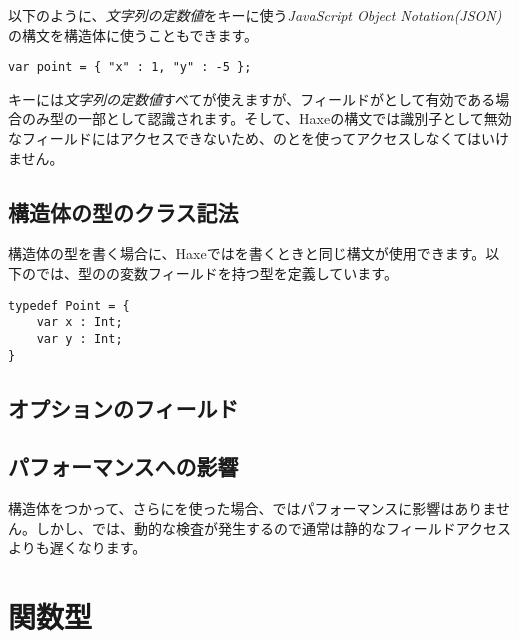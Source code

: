 以下のように、\emph{文字列の定数値}をキーに使う\emph{JavaScript Object Notation(JSON)}の構文を構造体に使うこともできます。

\begin{lstlisting}
var point = { "x" : 1, "y" : -5 };
\end{lstlisting}

キーには\emph{文字列の定数値}すべてが使えますが、フィールドがとして有効である場合のみ型の一部として認識されます。そして、Haxeの構文では識別子として無効なフィールドにはアクセスできないため、のとを使ってアクセスしなくてはいけません。

\subsection{構造体の型のクラス記法}
\label{types-structure-class-notation}

構造体の型を書く場合に、Haxeではを書くときと同じ構文が使用できます。以下のでは、型のの変数フィールドを持つ型を定義しています。

\begin{lstlisting}
typedef Point = {
    var x : Int;
    var y : Int;
}
\end{lstlisting}

\subsection{オプションのフィールド}
\label{types-structure-optional-fields}


\subsection{パフォーマンスへの影響}
\label{types-structure-performance}

構造体をつかって、さらにを使った場合、ではパフォーマンスに影響はありません。しかし、では、動的な検査が発生するので通常は静的なフィールドアクセスよりも遅くなります。



\section{関数型}
\label{types-function}

